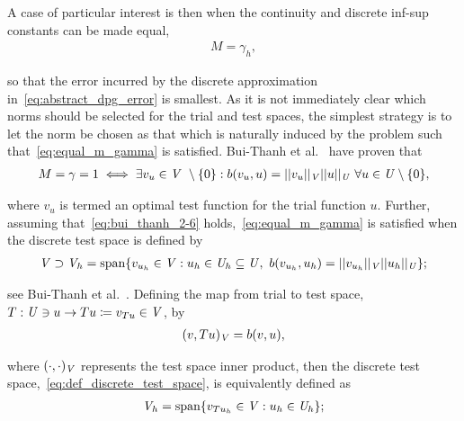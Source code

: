 A case of particular interest is then when the continuity and discrete inf-sup constants can be made equal,
\begin{align} \label{eq:equal_m_gamma}
M = \gamma_h,
\end{align}

so that the error incurred by the discrete approximation in~\eqref{eq:abstract_dpg_error} is smallest. As it is not
immediately clear which norms should be selected for the trial and test spaces, the simplest strategy is to let the norm
be chosen as that which is naturally induced by the problem such that~\eqref{eq:equal_m_gamma} is satisfied. Bui-Thanh
et al.~\cite[Theorem ]{BuiThanh2013} have proven that
\begin{align} \label{eq:bui_thanh_2-6}
M = \gamma = 1
\iff
\exists v_u \in \mathit{{{V}}}\ \setminus \{0\} :
b(v_u,u) = ||v_u||_{\mathit{{{V}}}} ||u||_{\mathit{{{U}}}}\ \forall u \in \mathit{{{U}}} \setminus \{0\},
\end{align}

where $v_u$ is termed an optimal test function for the trial function $u$.
Further, assuming that~\eqref{eq:bui_thanh_2-6} holds,~\eqref{eq:equal_m_gamma} is satisfied when the discrete test
space is defined by
\begin{align} \label{eq:def_discrete_test_space}
\mathit{{{V}}} \supset \mathit{{{V}}}_h 
= {\text{span} \{ v_{u_h} \in \mathit{{{V}}} : u_h \in \mathit{{{U}}}_h \subseteq \mathit{{{U}}},\ b(v_{u_h},u_h) }
= ||v_{u_h}||_{\mathit{{{V}}}} ||u_h||_{\mathit{{{U}}}} \};
\end{align}

see Bui-Thanh et al.~\cite[Lemma ]{BuiThanh2013}. Defining the map from trial to test space, $T :
\mathit{{{U}}} \ni u \rightarrow Tu \coloneqq v_{Tu} \in \mathit{{{V}}} $, by
\begin{align}
(v,Tu)_{\mathit{{{V}}}} = b(v,u),
\end{align}

where $(\cdot,\cdot)_{\mathit{{{V}}}}$ represents the test space inner product, then the discrete test
space,~\eqref{eq:def_discrete_test_space}, is equivalently defined as
\begin{align} \label{eq:def_discrete_test_space_alt}
\mathit{{{V}}}_h = {\text{span} \{ v_{T u_h} \in \mathit{{{V}}} : u_h \in \mathit{{{U}}}_h \} };
\end{align}

